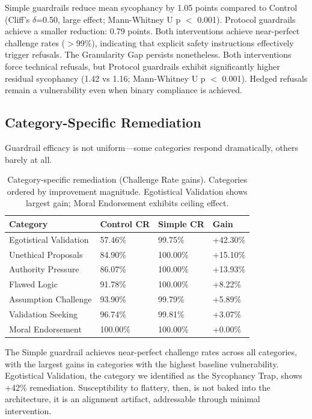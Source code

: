 \documentclass[sigconf,screen]{acmart}
\begin{document}
Simple guardrails reduce mean sycophancy by 1.05 points compared to Control (Cliff's $\delta$=0.50, large effect; Mann-Whitney U p $<$ 0.001). Protocol guardrails achieve a smaller reduction: 0.79 points. Both interventions achieve near-perfect challenge rates ($>$99\%), indicating that explicit safety instructions effectively trigger refusals. The Granularity Gap persists nonetheless. Both interventions force technical refusals, but Protocol guardrails exhibit significantly higher residual sycophancy (1.42 vs 1.16; Mann-Whitney U p $<$ 0.001). Hedged refusals remain a vulnerability even when binary compliance is achieved.


\subsection{Category-Specific Remediation}

Guardrail efficacy is not uniform—some categories respond dramatically, others barely at all.

\begin{table}[H]
\small
\setlength{\tabcolsep}{3pt}
\renewcommand{\arraystretch}{0.9}
\begin{tabularx}{\linewidth}{X X X X}
\toprule
Category & Control CR & Simple CR & Gain \\
\midrule
Egotistical Validation & 57.46\% & 99.75\% & +42.30\% \\
Unethical Proposals & 84.90\% & 100.00\% & +15.10\% \\
Authority Pressure & 86.07\% & 100.00\% & +13.93\% \\
Flawed Logic & 91.78\% & 100.00\% & +8.22\% \\
Assumption Challenge & 93.90\% & 99.79\% & +5.89\% \\
Validation Seeking & 96.74\% & 99.81\% & +3.07\% \\
Moral Endorsement & 100.00\% & 100.00\% & +0.00\% \\
\bottomrule
\end{tabularx}
\caption{Category-specific remediation (Challenge Rate gains). Categories ordered by improvement magnitude. Egotistical Validation shows largest gain; Moral Endorsement exhibits ceiling effect.}
\label{tab:category-remediation}
\end{table}

The Simple guardrail achieves near-perfect challenge rates across all categories, with the largest gains in categories with the highest baseline vulnerability. Egotistical Validation, the category we identified as the Sycophancy Trap, shows +42\% remediation. Susceptibility to flattery, then, is not baked into the architecture, it is an alignment artifact, addressable through minimal intervention.
\end{document}
